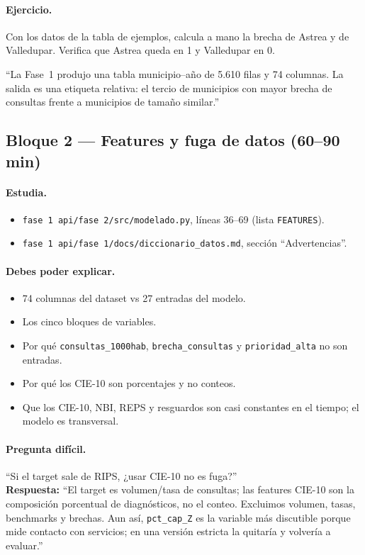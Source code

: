 \documentclass[11pt,a4paper]{article}
\newcommand{\code}[1]{\texttt{#1}}
\begin{document}
\paragraph{Ejercicio.}
Con los datos de la tabla de ejemplos, calcula a mano la brecha de Astrea y de Valledupar. Verifica que Astrea queda en 1 y Valledupar en 0.

\begin{tcolorbox}[frase,title={Frase para el profesor}]
``La Fase~1 produjo una tabla municipio--año de 5.610 filas y 74 columnas. La salida es una etiqueta relativa: el tercio de municipios con mayor brecha de consultas frente a municipios de tamaño similar.''
\end{tcolorbox}

\subsection{Bloque 2 --- Features y fuga de datos (60--90 min)}

\paragraph{Estudia.}
\begin{itemize}[leftmargin=*]
  \item \code{fase 1 api/fase 2/src/modelado.py}, líneas 36--69 (lista \code{FEATURES}).
  \item \code{fase 1 api/fase 1/docs/diccionario_datos.md}, sección ``Advertencias''.
\end{itemize}

\paragraph{Debes poder explicar.}
\begin{itemize}[leftmargin=*]
  \item 74 columnas del dataset vs 27 entradas del modelo.
  \item Los cinco bloques de variables.
  \item Por qué \code{consultas_1000hab}, \code{brecha_consultas} y \code{prioridad_alta} no son entradas.
  \item Por qué los CIE-10 son porcentajes y no conteos.
  \item Que los CIE-10, NBI, REPS y resguardos son casi constantes en el tiempo; el modelo es transversal.
\end{itemize}

\paragraph{Pregunta difícil.}
``Si el target sale de RIPS, ¿usar CIE-10 no es fuga?''\\
\textbf{Respuesta:} ``El target es volumen/tasa de consultas; las features CIE-10 son la composición porcentual de diagnósticos, no el conteo. Excluimos volumen, tasas, benchmarks y brechas. Aun así, \code{pct_cap_Z} es la variable más discutible porque mide contacto con servicios; en una versión estricta la quitaría y volvería a evaluar.''
\end{document}
